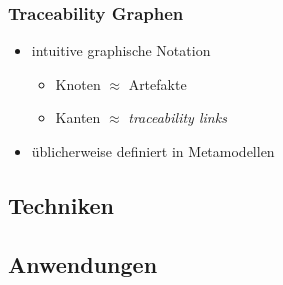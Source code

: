 \subsubsection{Traceability Graphen}
\begin{itemize}

\item
intuitive graphische Notation
\begin{itemize}
\item Knoten $\approx$ Artefakte
\item Kanten $\approx$ \textit{traceability links}
\end{itemize}

\item
üblicherweise definiert in Metamodellen


\end{itemize}

\subsection{Techniken}
\subsection{Anwendungen}
